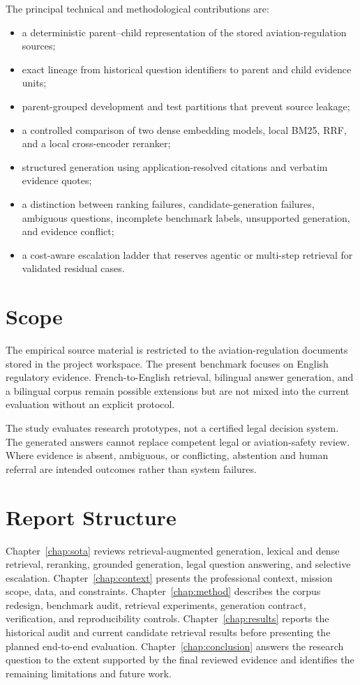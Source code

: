 The principal technical and methodological contributions are:

\begin{itemize}
  \item a deterministic parent--child representation of the stored aviation-regulation sources;
  \item exact lineage from historical question identifiers to parent and child evidence units;
  \item parent-grouped development and test partitions that prevent source leakage;
  \item a controlled comparison of two dense embedding models, local BM25, \ac{RRF}, and a local cross-encoder reranker;
  \item structured generation using application-resolved citations and verbatim evidence quotes;
  \item a distinction between ranking failures, candidate-generation failures, ambiguous questions, incomplete benchmark labels, unsupported generation, and evidence conflict;
  \item a cost-aware escalation ladder that reserves agentic or multi-step retrieval for validated residual cases.
\end{itemize}

\section{Scope}

The empirical source material is restricted to the aviation-regulation documents stored in the project workspace. The present benchmark focuses on English regulatory evidence. French-to-English retrieval, bilingual answer generation, and a bilingual corpus remain possible extensions but are not mixed into the current evaluation without an explicit protocol.

The study evaluates research prototypes, not a certified legal decision system. The generated answers cannot replace competent legal or aviation-safety review. Where evidence is absent, ambiguous, or conflicting, abstention and human referral are intended outcomes rather than system failures.

\section{Report Structure}

Chapter~\ref{chap:sota} reviews retrieval-augmented generation, lexical and dense retrieval, reranking, grounded generation, legal question answering, and selective escalation. Chapter~\ref{chap:context} presents the professional context, mission scope, data, and constraints. Chapter~\ref{chap:method} describes the corpus redesign, benchmark audit, retrieval experiments, generation contract, verification, and reproducibility controls. Chapter~\ref{chap:results} reports the historical audit and current candidate retrieval results before presenting the planned end-to-end evaluation. Chapter~\ref{chap:conclusion} answers the research question to the extent supported by the final reviewed evidence and identifies the remaining limitations and future work.

